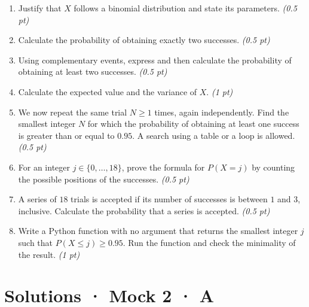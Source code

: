 \begin{enumerate}

\item Justify that $X$ follows a binomial distribution and state its parameters. \hfill\textit{(0.5 pt)}

\item Calculate the probability of obtaining exactly two successes. \hfill\textit{(0.5 pt)}

\item Using complementary events, express and then calculate the probability of obtaining at least two successes. \hfill\textit{(0.5 pt)}

\item Calculate the expected value and the variance of $X$. \hfill\textit{(1 pt)}

\item We now repeat the same trial $N\ge1$ times, again independently. Find the smallest integer $N$ for which the probability of obtaining at least one success is greater than or equal to $\num{0,95}$. A search using a table or a loop is allowed. \hfill\textit{(0.5 pt)}

\item For an integer $j\in\{0,\ldots,18\}$, prove the formula for $P(X=j)$ by counting the possible positions of the successes. \hfill\textit{(0.5 pt)}

\item A series of $18$ trials is accepted if its number of successes is between $1$ and $3$, inclusive. Calculate the probability that a series is accepted. \hfill\textit{(0.5 pt)}

\item Write a Python function with no argument that returns the smallest integer $j$ such that $P(X\le j)\ge\num{0,95}$. Run the function and check the minimality of the result. \hfill\textit{(1 pt)}

\end{enumerate}

\ifmxteacher\mxnewpage

\section*{Solutions · Mock 2 · A}\label{cor:8-3}

